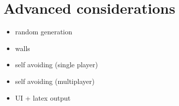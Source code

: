 \documentclass[10pt]{beamer}
\begin{document}
\begin{frame}[fragile]
  \begin{lstlisting}[language=haskell, basicstyle=\ttfamily]
  \end{lstlisting}
\end{frame}
\begin{frame}[fragile]
  \begin{lstlisting}[language=haskell, basicstyle=\ttfamily]
  \end{lstlisting}
\end{frame}
\begin{frame}[fragile]
  \begin{lstlisting}[language=haskell, basicstyle=\ttfamily]
  \end{lstlisting}
\end{frame}
\begin{frame}[fragile]
  \begin{lstlisting}[language=haskell, basicstyle=\ttfamily]
  \end{lstlisting}
\end{frame}
\begin{frame}[fragile]
  \begin{lstlisting}[language=haskell, basicstyle=\ttfamily]
  \end{lstlisting}
\end{frame}
\begin{frame}[fragile]
  \begin{lstlisting}[language=haskell, basicstyle=\ttfamily]
  \end{lstlisting}
\end{frame}
\begin{frame}[fragile]
  \begin{lstlisting}[language=haskell, basicstyle=\ttfamily]
  \end{lstlisting}
\end{frame}


\section{Advanced considerations}
\begin{frame}[fragile]
  \begin{itemize}
    \item random generation
    \item walls
    \item self avoiding (single player)
    \item self avoiding (multiplayer)
    \item UI + latex output
  \end{itemize}
\end{frame}

% 
% 
\end{document}
